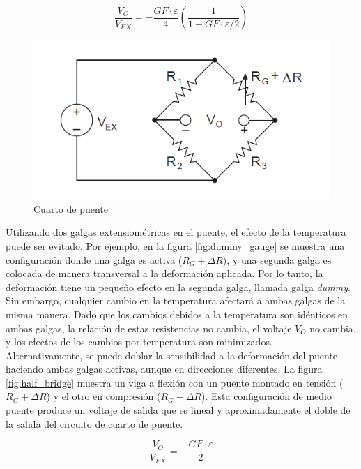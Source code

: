 \begin{equation}\label{eq:vovex}
\frac{V_O}{V_{EX}} = - \frac{GF\cdot \varepsilon}{4} \left( \frac{1}{1+GF\cdot\varepsilon/2} \right)
\end{equation}

\begin{figure}[!h]
\centering
\includegraphics[scale=0.55]{src/ch2/quarter_bridge.png}
\caption{Cuarto de puente}
\label{fig:quarter_bridge}
\end{figure}

Utilizando dos galgas extensiométricas en el puente, el efecto de la temperatura puede ser 
evitado. Por ejemplo, en la figura \ref{fig:dummy_gauge} se muestra una configuración donde 
una galga es activa ($R_G + \Delta R$), y una segunda galga es colocada de manera transversal 
a la deformación aplicada. Por lo tanto, la deformación tiene un pequeño efecto en la segunda 
galga, llamada galga \textit{dummy}. Sin embargo, cualquier cambio en la temperatura afectará 
a ambas galgas de la misma manera. Dado que los cambios debidos a la temperatura son idénticos 
en ambas galgas, la relación de estas resistencias no cambia, el voltaje $V_O$ no cambia, 
y los efectos de los cambios por temperatura son minimizados. ~\cite{gageNI} \\

Alternativamente, se puede doblar la sensibilidad a la deformación del puente haciendo 
ambas galgas activas, aunque en direcciones diferentes. La figura \ref{fig:half_bridge} 
muestra un viga a flexión con un puente montado en tensión ($R_G + \Delta R$) y el otro 
en compresión ($R_G - \Delta R$). Esta configuración de medio puente produce un voltaje 
de salida que es lineal y aproximadamente el doble de la salida del circuito de cuarto 
de puente. ~\cite{gageNI}

\begin{equation}
\frac{V_O}{V_{EX}} = - \frac{GF \cdot \varepsilon}{2}
\end{equation}

